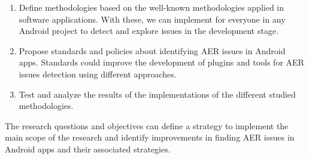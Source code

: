 \begin{enumerate}
	\item Define methodologies based on the well-known methodologies applied in software applications. With these, we can implement for everyone in any Android project to detect and explore issues in the development stage.
	\item Propose standards and policies about identifying AER issues in Android apps. Standards could improve the development of plugins and tools for AER issues detection using different approaches.
	\item Test and analyze the results of the implementations of the different studied methodologies.
\end{enumerate}


The research questions and objectives can define a strategy to implement the main scope of the research and identify improvements in finding AER issues in Android apps and their associated strategies.